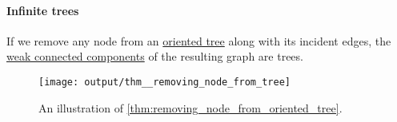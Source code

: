 \paragraph{Infinite trees}

\begin{proposition}\label{thm:removing_node_from_oriented_tree}
  If we remove any node from an \hyperref[def:oriented_tree]{oriented tree} along with its incident edges, the \hyperref[def:graph_connected_component]{weak connected components} of the resulting graph are trees.

  \begin{figure}[!ht]
    \centering
    \texttt{[image: output/thm\_\_removing\_node\_from\_tree]}
    \caption{An illustration of \cref{thm:removing_node_from_oriented_tree}.}\label{fig:thm:removing_node_from_oriented_tree}
  \end{figure}
\end{proposition}
